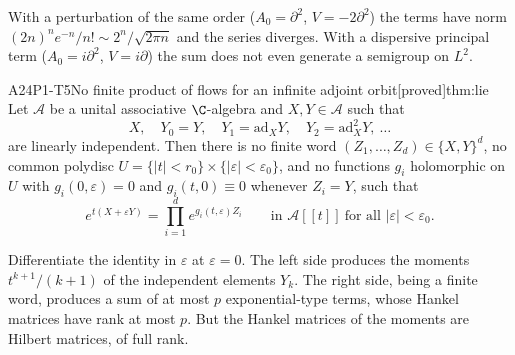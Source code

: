 \documentclass[11pt,a4paper,oneside]{report}
\newcommand{\badge}[2]{\textcolor{#1}{\textsf{\footnotesize[#2]}}}
\newcommand{\proved}{\badge{cC}{proved}}
\newcommand{\led}[1]{\textcolor{cG}{\textsf{\footnotesize(#1)}}}
\newenvironment{dimcard}[5]{\par\Needspace{12\baselineskip}\begin{dimcardbox}{#1}{#2}{#3}{#4}{#5}}{\end{dimcardbox}}
\begin{document}
\begin{caution}[title={The hypotheses cannot be dropped \led{P3-C1}}]
With a perturbation of the same order ($A_0=\partial^2$, $V=-2\partial^2$) the terms have norm $(2n)^ne^{-n}/n!\sim2^n/\sqrt{2\pi n}$ and the series diverges. With a dispersive principal term ($A_0=i\partial^2$, $V=i\partial$) the sum does not even generate a semigroup on $L^2$.
\end{caution}

\begin{dimcard}{A24}{P1-T5}{No finite product of flows for an infinite adjoint orbit}{\proved}{thm:lie}
Let $\mathcal A$ be a unital associative $\C$-algebra and $X,Y\in\mathcal A$ such that
\[
X,\quad Y_0=Y,\quad Y_1=\mathrm{ad}_XY,\quad Y_2=\mathrm{ad}_X^2Y,\ \dots
\]
are linearly independent. Then there is no finite word $(Z_1,\dots,Z_d)\in\{X,Y\}^d$, no common polydisc $U=\{|t|<r_0\}\times\{|\varepsilon|<\varepsilon_0\}$, and no functions $g_i$ holomorphic on $U$ with $g_i(0,\varepsilon)=0$ and $g_i(t,0)\equiv0$ whenever $Z_i=Y$, such that
\[
e^{t(X+\varepsilon Y)}=\prod_{i=1}^de^{g_i(t,\varepsilon)Z_i}\qquad\text{in }\mathcal A[[t]]\ \text{for all }|\varepsilon|<\varepsilon_0 .
\]
\end{dimcard}

\begin{proofidea}
Differentiate the identity in $\varepsilon$ at $\varepsilon=0$. The left side produces the moments $t^{k+1}/(k+1)$ of the independent elements $Y_k$. The right side, being a finite word, produces a sum of at most $p$ exponential-type terms, whose Hankel matrices have rank at most $p$. But the Hankel matrices of the moments are Hilbert matrices, of full rank.
\end{proofidea}
\end{document}
